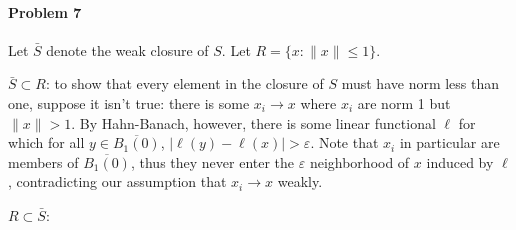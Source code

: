 \documentclass[12pt]{article}
\begin{document}
\paragraph{Problem 7}

Let $\bar{S}$ denote the weak closure of $S$. Let $R = \{x:\|x\| \leq 1\}$.

$\bar{S}\subset R$: to show that every element in the closure of $S$ must have
norm less than one, suppose it isn't true: there is some $x_i \to x$ where
$x_i$ are norm 1 but $\|x\| > 1$. By Hahn-Banach, however, there is some linear
functional $\ell$ for which for all $y \in \overline{B_1(0)}$, $|\ell(y)-\ell(x)
| > \varepsilon$. Note that $x_i$ in particular are members of $\overline{B_1(0)}
$, thus they never enter the $\varepsilon$ neighborhood of $x$ induced by $\ell$,
contradicting our assumption that $x_i\to x$ weakly.

$R\subset \bar{S}$:

\end{document}
